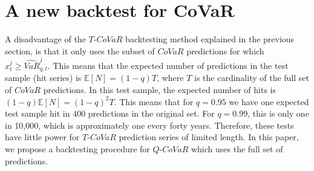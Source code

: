 \documentclass[12pt]{article}
\begin{document}

\section{A new backtest for CoVaR}  \label{backtnew}
A disadvantage of the $T$-$CoVaR$ backtesting method explained in the previous section, is that it only uses the subset of $CoVaR$ predictions for which $x^{j}_t\geq \widehat{VaR}_{q,t}^{j}$. This means that the expected number of predictions in the test sample (hit series) is $\mathbb{E}\left[N\right]=(1-q)T$, where $T$ is the cardinality of the full set of $CoVaR$ predictions. In this test sample, the expected number of hits is $(1-q)\mathbb{E}\left[N\right]=(1-q)^2T$. This means that for $q=0.95$ we have one expected test sample hit in $400$ predictions in the original set. For $q=0.99$, this is only one in 10,000, which is approximately one every forty years. Therefore, these tests have little power for $T$-$CoVaR$ prediction series of limited length. In this paper, we propose a backtesting procedure for $Q$-$CoVaR$ which uses the full set of predictions.
\end{document}
